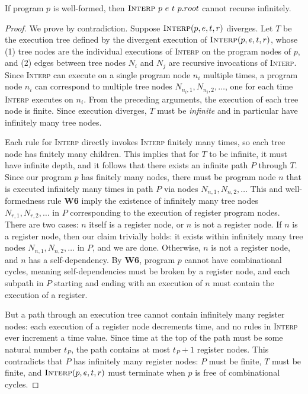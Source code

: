 \begin{lemma}
    \label{lemma:infinite-recursion-impossible}
    If program $p$ is well-formed, then
    $\textsc{Interp}\ p\ e\ t\ p.root$
    cannot recurse infinitely.
\end{lemma}
\begin{proof}
We prove by contradiction.
Suppose 
    $\textsc{Interp}(p, e, t, r)$ diverges.
Let $T$ be the execution tree
    defined by the divergent execution
    of $\textsc{Interp}(p, e, t, r)$,
    whose (1) tree nodes are the 
    individual executions of \textsc{Interp}
    on the program nodes of $p$,
    and (2) edges between
    tree nodes $N_i$ and $N_j$ are
    recursive invocations of \textsc{Interp}.
Since \textsc{Interp} can execute
    on a single program node $n_i$ multiple times,
    a program node $n_i$ can correspond to
    multiple tree nodes $N_{n_i, 1}, N_{n_i, 2}, \ldots$,
    one for each time \textsc{Interp}
    executes on $n_i$.
From the preceding arguments, the execution of each
    tree node is finite.
Since execution diverges, 
    $T$ must be \textit{infinite}
    and in particular have
    infinitely many tree nodes.

Each rule for \textsc{Interp}
    directly invokes \textsc{Interp} finitely
    many times, so each tree node has
    finitely many children.
This implies that for $T$
    to be infinite, it
    must have infinite depth,
    and it follows that
    there exists
    an infinite path
    $P$ through $T$.
Since our program $p$ has finitely many nodes,
    there must be program node $n$
    that is executed infinitely many
    times in path $P$ via nodes
    $N_{n,1}, N_{n,2}, \ldots$
This and well-formedness rule
    \textbf{W6} imply the existence
    of infinitely many tree nodes
    $N_{r,1}, N_{r,2}, \ldots$
    in $P$ corresponding to the
    execution of register program nodes.
There are two cases: $n$ itself is a
    register node, or
    $n$ is not a register node.
If $n$ is a register node, then
    our claim trivially holds:
    it exists within infinitely many tree
    nodes $N_{n,1}, N_{n,2}, \ldots$
    in $P$, and we are done.
Otherwise, $n$ is not a register node,
    and $n$ has a self-dependency.
By \textbf{W6}, program $p$ cannot have combinational
    cycles, meaning self-dependencies
    must be broken by a register
    node, and each subpath in $P$
    starting and ending with an execution of $n$
    must contain the execution of a register.

But a path through an execution tree
    cannot contain infinitely many register nodes:
    each execution of a register node decrements
    time, and no rules in \textsc{Interp} ever
    increment a time value.
Since time at the top of the path must
    be some natural number $t_P$, the path
    contains at most $t_P + 1$ register nodes.
This contradicts that $P$ has infinitely many
    register nodes: $P$ must be finite,
    $T$ must be finite,
    and $\textsc{Interp}(p, e, t, r)$
    must terminate when $p$ is free
    of combinational cycles.
\end{proof}


